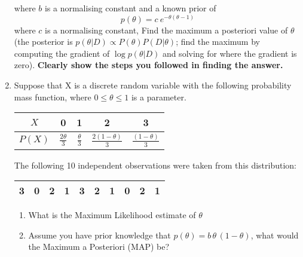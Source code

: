 \documentclass [11pt]{article}
\newcommand{\answer}[1]{}
\begin{document}
\begin{enumerate}
where $b$ is a normalising constant and a known prior of
\begin{equation*}
p(\theta) = c \ e^{-\theta (\theta-1)}
\end{equation*}
where $c$ is a normalising constant,
Find the maximum a posteriori value of $\theta$ (the posterior is $p(\theta| D) \propto P(\theta) P(D|\theta)$; find the maximum by computing the gradient of $\log p(\theta | D)$ and solving for where the gradient is zero).   \textbf{Clearly show the steps you followed in finding the answer.}

\answer{
\begin{align}
&p(D|\theta) p(\theta) &= &b e^{-(3-\theta)^2} c e^{-\theta(\theta-1)}\\
&\ln p(D|\theta) p(\theta) &= &\ln b + \ln c - (3-\theta)^2 - \theta(\theta-1)\\
&\frac{d}{d\theta} \ln p(D|\theta) p(\theta) &= &2 (3-\theta) - 2\theta +1\\
&&= &-4 \theta +7
\end{align}
\begin{align}
&-4 \theta_{MAP} + 7 = 0\\
&\theta_{MAP} = \frac{7}{4}
\end{align}
}

\item Suppose that X is a discrete random variable with the following probability mass function, where $0 \le \theta \le 1$ is a parameter.

\begin{center}
\begin{tabular}{|c|c|c|c|c|}
\hline
$X$ &0 &1 &2 &3\\ \hline
$P(X)$ &$\frac{2 \theta}{3}$ &$\frac{\theta}{3}$ &$\frac{2(1-\theta)}{3}$ &$\frac{(1-\theta)}{3}$\\ \hline
\end{tabular}
\end{center}

The following 10 independent observations were taken from this distribution:

\begin{center}
\begin{tabular}{|c|c|c|c|c|c|c|c|c|c|}
\hline
3 &0 &2 &1 &3 &2 &1 &0 &2 &1\\ \hline
\end{tabular}
\end{center}

\begin{enumerate}
\item What is the Maximum Likelihood estimate of $\theta$
\item Assume you have prior knowledge that $p(\theta) = b\, \theta \, (1-\theta)$, what would the Maximum a Posteriori (MAP) be?
\end{enumerate}


\end{enumerate}
\end{document}
